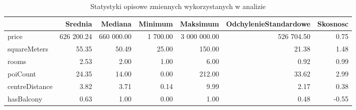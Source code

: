 \documentclass{report}
\begin{document}
\begin{table}[H]

\caption{Statystyki opisowe zmiennych wykorzystanych w analizie}
\centering
\begin{tabular}[t]{lrrrrrr}
\toprule
  & Srednia & Mediana & Minimum & Maksimum & OdchylenieStandardowe & Skosnosc\\
\midrule
price & 626 200.24 & 660 000.00 & 1 700.00 & 3 000 000.00 & 526 704.50 & 0.75\\
squareMeters & 55.35 & 50.49 & 25.00 & 150.00 & 21.38 & 1.48\\
rooms & 2.53 & 2.00 & 1.00 & 6.00 & 0.92 & 0.99\\
poiCount & 24.35 & 14.00 & 0.00 & 212.00 & 33.62 & 2.99\\
centreDistance & 3.82 & 3.71 & 0.14 & 9.99 & 2.17 & 0.38\\
hasBalcony & 0.63 & 1.00 & 0.00 & 1.00 & 0.48 & -0.55\\
\bottomrule
\end{tabular}
\end{table}


\end{document}

